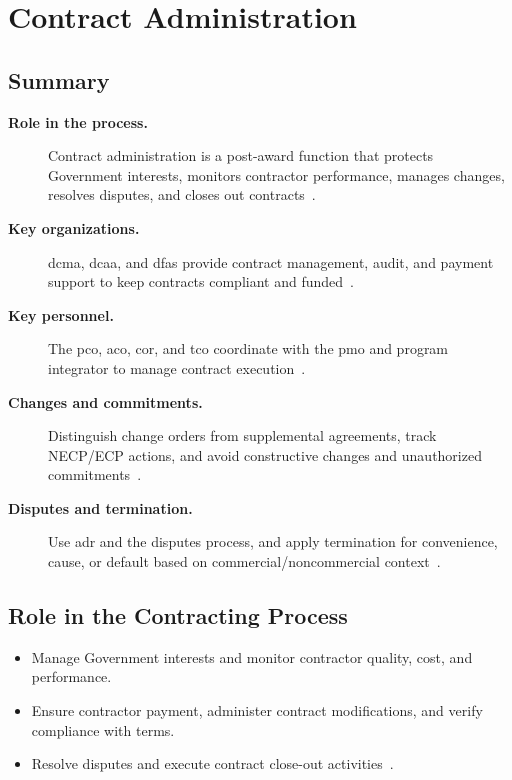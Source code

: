 \documentclass[../main.tex]{subfiles}
\begin{document}

\section{Contract Administration}

\subsection{Summary}
\begin{description}
  \item[\textbf{Role in the process.}] Contract administration is a post-award function that protects Government interests, monitors contractor performance, manages changes, resolves disputes, and closes out contracts~\autocite{edo-3-2-6-contract-administration-2025,FAR-42-302-Contract-Administration,FAR-43-103-Contract-Modifications,FAR-49-402-3-Default-Procedure}.
  \item[\textbf{Key organizations.}] \ac{dcma}, \ac{dcaa}, and \ac{dfas} provide contract management, audit, and payment support to keep contracts compliant and funded~\autocite{edo-3-2-6-contract-administration-2025,DCMA-About-2026,DCAA-About-2026,DFAS-Doing-Business-2026}.
  \item[\textbf{Key personnel.}] The \ac{pco}, \ac{aco}, \ac{cor}, and \ac{tco} coordinate with the \ac{pmo} and program integrator to manage contract execution~\autocite{edo-3-2-6-contract-administration-2025,FAR-42-302-Contract-Administration}.
  \item[\textbf{Changes and commitments.}] Distinguish change orders from supplemental agreements, track NECP/ECP actions, and avoid constructive changes and unauthorized commitments~\autocite{edo-3-2-6-contract-administration-2025}.
  \item[\textbf{Disputes and termination.}] Use \ac{adr} and the disputes process, and apply termination for convenience, cause, or default based on commercial/noncommercial context~\autocite{edo-3-2-6-contract-administration-2025,FAR-33-204-ADR-Policy,FAR-33-202-Disputes,FAR-49-402-3-Default-Procedure,FAR-52-212-4-Commercial-Terms}.
\end{description}

\subsection{Role in the Contracting Process}
\begin{itemize}
  \item Manage Government interests and monitor contractor quality, cost, and performance.
  \item Ensure contractor payment, administer contract modifications, and verify compliance with terms.
  \item Resolve disputes and execute contract close-out activities~\autocite{edo-3-2-6-contract-administration-2025}.
\end{itemize}
\end{document}
